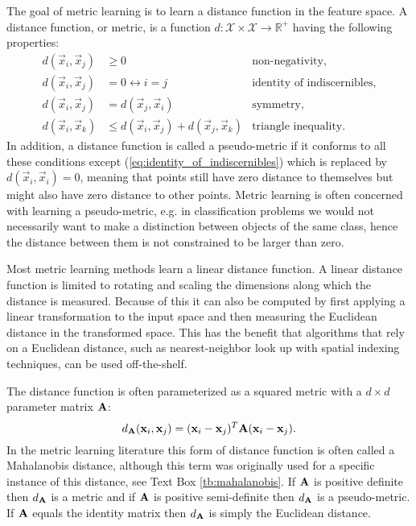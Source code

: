 The goal of metric learning is to learn a distance function in the feature space. A distance function, or metric, is a function $d: \mathcal{X} \times \mathcal{X} \rightarrow \mathbb{R}^{+}$ having the following properties:
\begin{subequations}
\begin{align}
        d(\vec{x}_i, \vec{x}_j) & \geq 0 &  \text{non-negativity}, \label{eq:non-negativity}\\
        d(\vec{x}_i, \vec{x}_j) & = 0 \leftrightarrow i = j & \text{identity of indiscernibles}, \label{eq:identity_of_indiscernibles} \\
        d(\vec{x}_i, \vec{x}_j) & = d(\vec{x}_j, \vec{x}_i) &  \text{symmetry}, \label{eq:symmetry}\\
        d(\vec{x}_i, \vec{x}_k) & \leq d(\vec{x}_i, \vec{x}_j) + d(\vec{x}_j, \vec{x}_k) &  \text{triangle inequality}. \label{eq:triangle_unequality}
\end{align}
\end{subequations}
In addition, a distance function is called a pseudo-metric if it conforms to all these conditions except (\ref{eq:identity_of_indiscernibles}) which is replaced by $d(\vec{x}_i, \vec{x}_i) = 0$, meaning that points still have zero distance to themselves but might also have zero distance to other points. Metric learning is often concerned with learning a pseudo-metric, e.g. in classification problems we would not necessarily want to make a distinction between objects of the same class, hence the distance between them is not constrained to be larger than zero.

Most metric learning methods learn a linear distance function. A linear distance function is limited to rotating and scaling the dimensions along which the distance is measured. Because of this it can also be computed by first applying a linear transformation to the input space and then measuring the Euclidean distance in the transformed space. This has the benefit that algorithms that rely on a Euclidean distance, such as nearest-neighbor look up with spatial indexing techniques, can be used off-the-shelf.

The distance function is often parameterized as a squared metric with a $d \times d$ parameter matrix $\mathbf{A}$:
\begin{equation}
d_{\mathbf{A}}(\mathbf{x}_i, \mathbf{x}_j) = (\mathbf{x}_i - \mathbf{x}_j)^T\mathbf{A}(\mathbf{x}_i - \mathbf{x}_j).
\label{eq:linearmetric}
\end{equation}
In the metric learning literature this form of distance function is often called a Mahalanobis distance, although this term was originally used for a specific instance of this distance, see Text Box \ref{tb:mahalanobis}. If $\mathbf{A}$ is positive definite then $d_{\mathbf{A}}$ is a metric and if $\mathbf{A}$ is positive semi-definite then $d_{\mathbf{A}}$ is a pseudo-metric. If $\mathbf{A}$ equals the identity matrix then $d_{\mathbf{A}}$ is simply the Euclidean distance.

